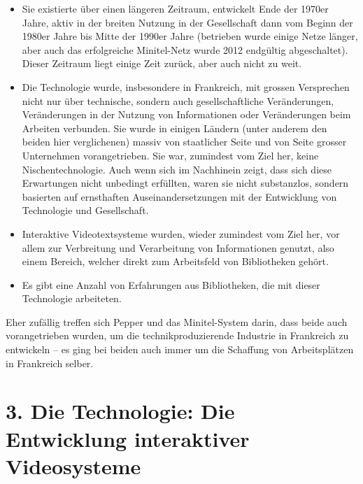 \documentclass[a4paper,
fontsize=11pt,
oneside,
numbers=noperiodatend,
parskip=half-,
bibliography=totoc,
final
]{scrartcl}
\begin{document}
\begin{itemize}
\item
  Sie existierte über einen längeren Zeitraum, entwickelt Ende der
  1970er Jahre, aktiv in der breiten Nutzung in der Gesellschaft dann
  vom Beginn der 1980er Jahre bis Mitte der 1990er Jahre (betrieben
  wurde einige Netze länger, aber auch das erfolgreiche Minitel-Netz
  wurde 2012 endgültig abgeschaltet). Dieser Zeitraum liegt einige Zeit
  zurück, aber auch nicht zu weit.
\item
  Die Technologie wurde, insbesondere in Frankreich, mit grossen
  Versprechen nicht nur über technische, sondern auch gesellschaftliche
  Veränderungen, Veränderungen in der Nutzung von Informationen oder
  Veränderungen beim Arbeiten verbunden. Sie wurde in einigen Ländern
  (unter anderem den beiden hier verglichenen) massiv von staatlicher
  Seite und von Seite grosser Unternehmen vorangetrieben. Sie war,
  zumindest vom Ziel her, keine Nischentechnologie. Auch wenn sich im
  Nachhinein zeigt, dass sich diese Erwartungen nicht unbedingt
  erfüllten, waren sie nicht substanzlos, sondern basierten auf
  ernsthaften Auseinandersetzungen mit der Entwicklung von Technologie
  und Gesellschaft.
\item
  Interaktive Videotextsysteme wurden, wieder zumindest vom Ziel her,
  vor allem zur Verbreitung und Verarbeitung von Informationen genutzt,
  also einem Bereich, welcher direkt zum Arbeitsfeld von Bibliotheken
  gehört.
\item
  Es gibt eine Anzahl von Erfahrungen aus Bibliotheken, die mit dieser
  Technologie arbeiteten.
\end{itemize}

Eher zufällig treffen sich Pepper und das Minitel-System darin, dass
beide auch vorangetrieben wurden, um die technikproduzierende Industrie
in Frankreich zu entwickeln -- es ging bei beiden auch immer um die
Schaffung von Arbeitsplätzen in Frankreich selber.

\hypertarget{die-technologie-die-entwicklung-interaktiver-videosysteme}{%
\section{3. Die Technologie: Die Entwicklung interaktiver
Videosysteme}\label{die-technologie-die-entwicklung-interaktiver-videosysteme}}
\end{document}
